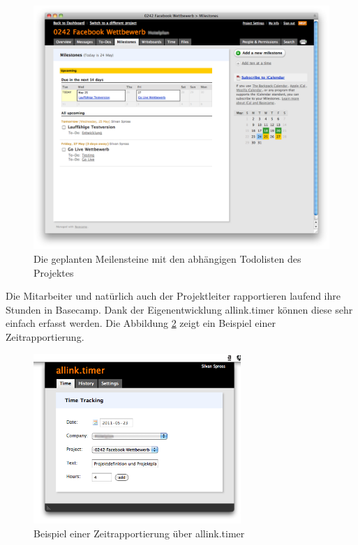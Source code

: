 \begin{figure}[htbp]
\begin{center}
\includegraphics[width=1.0\textwidth,angle=0]{./bilder/proof_of_concept/meilensteine_poc.png}
\caption[Die geplanten Meilensteine mit den abhängigen Todolisten des Projektes]{Die 
    geplanten Meilensteine mit den abhängigen Todolisten des Projektes\footnotemark}
\label{pic:meilensteine_poc}
\end{center}
\end{figure}

Die Mitarbeiter und natürlich auch der Projektleiter rapportieren laufend
ihre Stunden in Basecamp. Dank der Eigenentwicklung allink.timer können
diese sehr einfach erfasst werden. Die Abbildung \ref{pic:allink_timer} zeigt
ein Beispiel einer Zeitrapportierung.

\begin{figure}[htbp]
\begin{center}
\includegraphics[width=0.7\textwidth,angle=0]{./bilder/proof_of_concept/allink_timer.png}
\caption[Beispiel einer Zeitrapportierung über allink.timer]{Beispiel einer 
    Zeitrapportierung über allink.timer\footnotemark}
\label{pic:allink_timer}
\end{center}
\end{figure}

